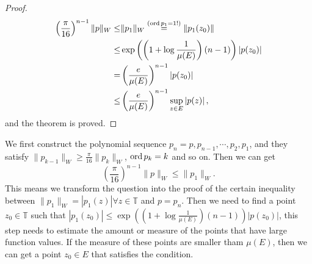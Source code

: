 \begin{proof}
\begin{equation*}
  \begin{aligned}
    \left( \frac{\pi}{16} \right) ^{n-1}\|p\|_{W}\le & \|p_1\|_{W}\overset{(\operatorname{ord} p_1=1 !)}{=}\|p_1(z_0)\|\\
    \le & \exp\left( \left( 1+\log \frac{1}{\mu(E)} \right) (n-1) \right) \left| p(z_0) \right| \\
    = & \left( \frac{e}{\mu(E)} \right) ^{n-1}\left| p(z_0) \right| \\
    \le  & \left( \frac{e}{\mu(E)} \right) ^{n-1}\sup_{z\in E}\left| p(z) \right|,
  \end{aligned}
\end{equation*}
and the theorem is proved.
\end{proof}
\begin{remark}
  We first construct the polynomial sequence $p_n=p,p_{n-1},\cdots,p_2,p_1$, and they satisfy $\|p_{k-1}\|_{W}\ge  \frac{\pi}{16}\|p_k\|_W$, $\operatorname{ord} p_k=k$ and so on. Then we can get 
  \[
    \left( \frac{\pi}{16} \right) ^{n-1}\|p\|_{W}\le \|p_1\|_{W}.
  \] 
  This means we transform the question into the proof of the certain inequality between $\|p_1\|_W=|p_1(z)| \forall z\in \mathbb{T}$ and $p=p_n$. Then we need to find a point  $z_0 \in \mathbb{T}$ such that $\left| p_1(z_0) \right|\le \exp\left( \left(1+\log \frac{1}{\mu(E)}\right)(n-1) \right) \left| p(z_0) \right|  $, this step needs to estimate the amount or measure of the points that have large function values. If the measure of these points are smaller tham $\mu(E)$, then we can get a point  $z_0 \in E$ that satisfies the condition.
\end{remark}
